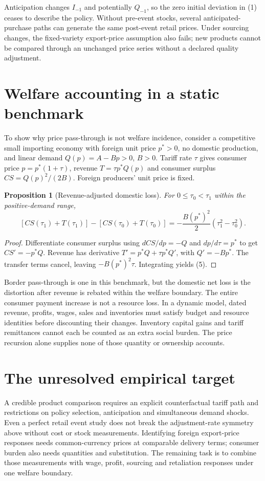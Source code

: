 \documentclass[11pt,a4paper]{article}
\newtheorem{proposition}[theorem]{Proposition}
\begin{document}
Anticipation changes $I_{-1}$ and potentially $Q_{-1}$, so the zero initial deviation in (1) ceases to describe the policy. Without pre-event stocks, several anticipated-purchase paths can generate the same post-event retail prices. Under sourcing changes, the fixed-variety export-price assumption also fails; new products cannot be compared through an unchanged price series without a declared quality adjustment.

\section{Welfare accounting in a static benchmark}
To show why price pass-through is not welfare incidence, consider a competitive small importing economy with foreign unit price $p^*>0$, no domestic production, and linear demand $Q(p)=A-Bp>0$, $B>0$. Tariff rate $\tau$ gives consumer price $p=p^*(1+\tau)$, revenue $T=\tau p^*Q(p)$ and consumer surplus $CS=Q(p)^2/(2B)$. Foreign producers' unit price is fixed.

\begin{proposition}[Revenue-adjusted domestic loss]
For $0\le\tau_0<\tau_1$ within the positive-demand range,
\[
 [CS(\tau_1)+T(\tau_1)]-[CS(\tau_0)+T(\tau_0)]
 =-\frac{B(p^*)^2}{2}(\tau_1^2-\tau_0^2).                 \tag{5}
\]
\end{proposition}
\begin{proof}
Differentiate consumer surplus using $dCS/dp=-Q$ and $dp/d\tau=p^*$ to get $CS'=-p^*Q$. Revenue has derivative $T'=p^*Q+\tau p^*Q'$, with $Q'=-Bp^*$. The transfer terms cancel, leaving $-B(p^*)^2\tau$. Integrating yields (5).
\end{proof}

Border pass-through is one in this benchmark, but the domestic net loss is the distortion after revenue is rebated within the welfare boundary. The entire consumer payment increase is not a resource loss. In a dynamic model, dated revenue, profits, wages, sales and inventories must satisfy budget and resource identities before discounting their changes. Inventory capital gains and tariff remittances cannot each be counted as an extra social burden. The price recursion alone supplies none of those quantity or ownership accounts.

\section{The unresolved empirical target}
A credible product comparison requires an explicit counterfactual tariff path and restrictions on policy selection, anticipation and simultaneous demand shocks. Even a perfect retail event study does not break the adjustment-rate symmetry above without cost or stock measurements. Identifying foreign export-price responses needs common-currency prices at comparable delivery terms; consumer burden also needs quantities and substitution. The remaining task is to combine those measurements with wage, profit, sourcing and retaliation responses under one welfare boundary.
\end{document}
